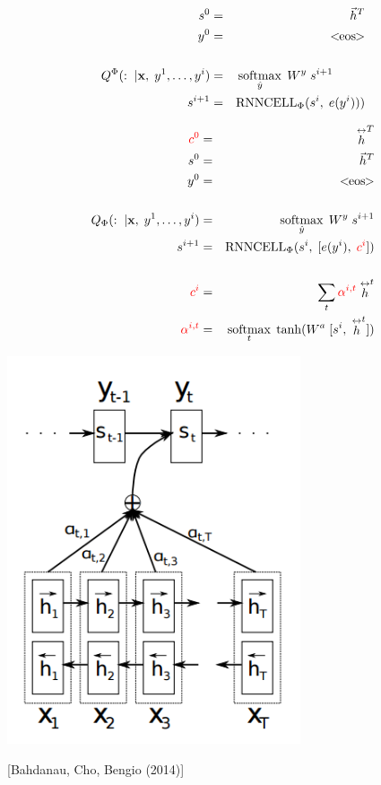 {\vfill
{}

\begin{eqnarray*}
  \\
  s^0 & = & \vec{h}^T \\
  y^0 & = & <\!\!\mathrm{eos}\!\!> \\
  \\
  Q^\Phi(:\;| {\bf x},\;y^1,\ldots,y^i) & = & \operatorname*{softmax}_{\hat{y}} \;W^y \;s^{i+1}\;\;\;\;\;\;\;\;\mbox{~} \\
  s^{i+1} & = & \mathrm{RNNCELL}_\Phi(s^i,\;e(y^i)))
\end{eqnarray*}


\begin{eqnarray*}
  {\color{red} c^0} & = & \stackrel{\leftrightarrow}{h}^T \\
  s^0 & = & \vec{h}^T \\
  y^0 & = & <\!\!\mathrm{eos}\!\!> \\
  \\
  Q_\Phi(:\;| {\bf x},\;y^1,\ldots,y^i) & = & \operatorname*{softmax}_{\hat{y}} \;W^y \;s^{i+1} \\
  s^{i+1} & = & \mathrm{RNNCELL}_\Phi(s^i,\;[e(y^i),\;{\color{red} c^i}]) \\
  \\
  {\color{red} c^i} & = & \sum_t {\color{red} \alpha^{i,t}} \stackrel{\leftrightarrow}{h}^t  \\
  {\color{red} \alpha^{i,t}} & = & \operatorname*{softmax}_t\; \mathrm{tanh}(W^a\;[s^i,\;\stackrel{\leftrightarrow}{h}^t])
\end{eqnarray*}


\centerline{\includegraphics[height=4.5in]{../images/attention}}
\centerline{[Bahdanau, Cho, Bengio (2014)]}

}
